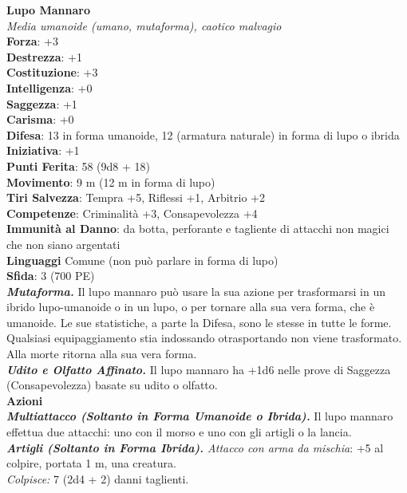 \begin{multicols}{2}
\medskip\textbf{Lupo Mannaro}\\
\emph{Media umanoide (umano, mutaforma), caotico malvagio}\\
\textbf{Forza}: +3\\
\textbf{Destrezza}: +1\\
\textbf{Costituzione}: +3\\
\textbf{Intelligenza}: +0\\
\textbf{Saggezza}: +1\\
\textbf{Carisma}: +0\\
\textbf{Difesa}: 13 in forma umanoide, 12 (armatura naturale) in forma di lupo o ibrida \\ \textbf{Iniziativa}: +1\\
\textbf{Punti Ferita}: 58 (9d8 + 18)\\
\textbf{Movimento}: 9 m (12 m in forma di lupo)\\
\textbf{Tiri Salvezza}: Tempra +5, Riflessi +1, Arbitrio +2\\
\textbf{Competenze}: Criminalità +3, Consapevolezza +4\\
\textbf{Immunità al Danno}: da botta, perforante e tagliente di attacchi non magici che non siano argentati\\
\textbf{Linguaggi} Comune (non può parlare in forma di lupo)\\
\textbf{Sfida}: 3 (700 PE)\smallskip\\
\emph{\textbf{Mutaforma.}} Il lupo mannaro può usare la sua azione per trasformarsi in un ibrido lupo-umanoide o in un lupo, o per tornare alla sua vera forma, che è umanoide. Le sue statistiche, a parte la Difesa, sono le stesse in tutte le forme. Qualsiasi equipaggiamento stia indossando otrasportando non viene trasformato. Alla morte ritorna alla sua vera  forma.\\

\emph{\textbf{Udito e Olfatto Affinato.}} Il lupo mannaro ha +1d6 nelle prove di Saggezza (Consapevolezza) basate su udito o olfatto.\\
\smallskip\textbf{Azioni}\\

\emph{\textbf{Multiattacco (Soltanto in Forma Umanoide o Ibrida).}} Il lupo mannaro effettua due attacchi: uno con il morso e uno con gli artigli o la lancia.\\
\emph{\textbf{Artigli (Soltanto in Forma Ibrida).} Attacco con arma da mischia}: +5 al colpire, portata 1 m, una creatura.\\
\emph{Colpisce:} 7 (2d4 + 2) danni taglienti.\\


\end{multicols}
